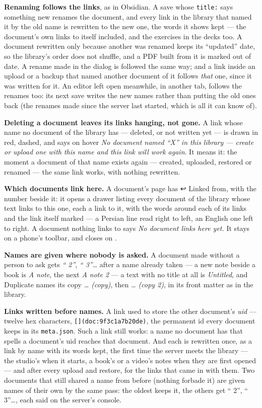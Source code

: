 \documentclass[11pt,oneside]{report}
\newcommand{\sym}[1]{{\symfont #1}}
\newcommand{\file}[1]{\texttt{#1}}
\newcommand{\key}[1]{\textsf{\small\fbox{#1}}}
\newcommand{\menu}[1]{\textsf{#1}}
\begin{document}
\textbf{Renaming follows the links}, as in Obsidian. A save whose
\texttt{title:} says something new renames the document, and every link in
the library that named it by the old name is rewritten to the new one, the
words it shows kept --- the document's own links to itself included, and the
exercises in the decks too. A document rewritten only because another was
renamed keeps its ``updated'' date, so the library's order does not shuffle,
and a PDF built from it is marked out of date. A rename made in the dialog
is followed the same way; and a link inside an upload or a backup that named
another document of it follows \emph{that} one, since it was written for it.
An editor left open meanwhile, in another tab, follows the renames too: its
next save writes the new names rather than putting the old ones back (the
renames made since the server last started, which is all it can know of).

\textbf{Deleting a document leaves its links hanging, not gone.} A link
whose name no document of the library has --- deleted, or not written yet ---
is drawn in red, dashed, and says on hover \emph{No document named ``X'' in
this library --- create or upload one with this name and this link will work
again}. It means it: the moment a document of that name exists again ---
created, uploaded, restored or renamed --- the same link works, with nothing
rewritten.

\textbf{Which documents link here.} A document's page has
\menu{\sym{↩} Linked from}, with the number beside it: it opens a drawer
listing every document of the library whose text links to this one, each a
link to it, with the words around each of its links and the link itself
marked --- a Persian line read right to left, an English one left to right.
A document nothing links to says \emph{No document links here yet.} It stays
on a phone's toolbar, and closes on \key{Esc}.

\textbf{Names are given where nobody is asked.} A document made without a
person to ask gets \emph{`` 2''}, \emph{`` 3''}\ldots{} after a name already
taken --- a new note beside a book is \emph{A note}, the next \emph{A note 2}
--- a text with no title at all is \emph{Untitled}, and \menu{Duplicate}
names its copy \emph{\ldots{} (copy)}, then \emph{\ldots{} (copy 2)}, in its
front matter as in the library.

\begin{goodbox}
\textbf{Links written before names.} A link used to store the other
document's \emph{uid} --- twelve hex characters, \texttt{[](doc:9f3c1a7b20de)},
the permanent id every document keeps in its \file{meta.json}. Such a link
still works: a name no document has that spells a document's uid reaches
that document. And each is rewritten once, as a link by name with its words
kept, the first time the server meets the library --- the studio's when it
starts, a book's or a video's notes when they are first opened --- and after
every upload and restore, for the links that came in with them. Two
documents that still shared a name from before (nothing forbade it) are
given names of their own by the same pass: the oldest keeps it, the others
get `` 2'', `` 3''\ldots, each said on the server's console.
\end{goodbox}
\end{document}
